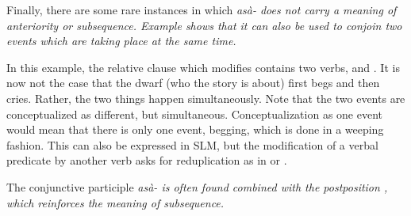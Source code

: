 Finally, there are some rare instances in which \em asà- \em does not carry a meaning of anteriority or subsequence. Example  shows that it can also be used to conjoin two events which are taking place at the same time.


In this example, the relative clause which modifies  contains two verbs,  and . It is now not the case that the dwarf (who the story is about) first begs and then cries. Rather, the two things happen simultaneously. Note that the two events are conceptualized as different, but simultaneous. Conceptualization as one event would mean that there is only one event, begging, which is done in a weeping fashion. This can also be expressed in SLM, but the modification of a verbal predicate by another verb asks for reduplication as in  or .



The conjunctive participle \em asà- \em is often found combined with the postposition , which reinforces the meaning of subsequence.

